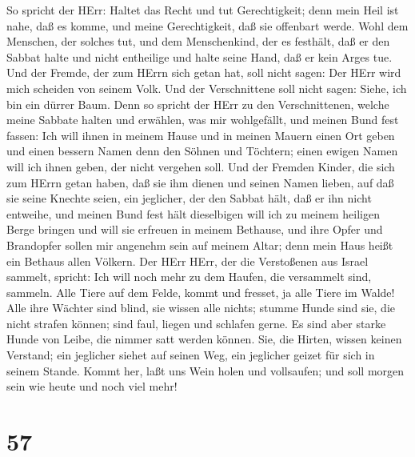  So spricht der HErr: Haltet das Recht und tut
Gerechtigkeit; denn mein Heil ist nahe, daß es komme, und meine
Gerechtigkeit, daß sie offenbart werde.  Wohl dem Menschen,
der solches tut, und dem Menschenkind, der es festhält, daß er den
Sabbat halte und nicht entheilige und halte seine Hand, daß er kein
Arges tue.  Und der Fremde, der zum HErrn sich getan hat,
soll nicht sagen: Der HErr wird mich scheiden von seinem Volk. Und der
Verschnittene soll nicht sagen: Siehe, ich bin ein dürrer Baum.
 Denn so spricht der HErr zu den Verschnittenen, welche
meine Sabbate halten und erwählen, was mir wohlgefällt, und meinen Bund
fest fassen:  Ich will ihnen in meinem Hause und in meinen
Mauern einen Ort geben und einen bessern Namen denn den Söhnen und
Töchtern; einen ewigen Namen will ich ihnen geben, der nicht vergehen
soll.  Und der Fremden Kinder, die sich zum HErrn getan
haben, daß sie ihm dienen und seinen Namen lieben, auf daß sie seine
Knechte seien, ein jeglicher, der den Sabbat hält, daß er ihn nicht
entweihe, und meinen Bund fest hält  dieselbigen will ich zu
meinem heiligen Berge bringen und will sie erfreuen in meinem Bethause,
und ihre Opfer und Brandopfer sollen mir angenehm sein auf meinem Altar;
denn mein Haus heißt ein Bethaus allen Völkern.  Der HErr
HErr, der die Verstoßenen aus Israel sammelt, spricht: Ich will noch
mehr zu dem Haufen, die versammelt sind, sammeln.  Alle
Tiere auf dem Felde, kommt und fresset, ja alle Tiere im Walde!
 Alle ihre Wächter sind blind, sie wissen alle nichts;
stumme Hunde sind sie, die nicht strafen können; sind faul, liegen und
schlafen gerne.  Es sind aber starke Hunde von Leibe, die
nimmer satt werden können. Sie, die Hirten, wissen keinen Verstand; ein
jeglicher siehet auf seinen Weg, ein jeglicher geizet für sich in seinem
Stande.  Kommt her, laßt uns Wein holen und vollsaufen; und
soll morgen sein wie heute und noch viel mehr!

\hypertarget{section-56}{%
\section{57}\label{section-56}}

